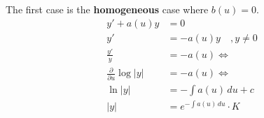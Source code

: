 The first case is the \textbf{homogeneous} case where $b(u) = 0$.
\begin{align*}
    y'+a(u)y & = 0\\
    y' & = -a(u)y \quad ,y\neq 0\\
    \frac{y'}{y} & = -a(u) \Leftrightarrow\\
    \frac{\partial}{\partial u} \log|y| & = -a(u) \Leftrightarrow\\
    \ln|y| & = -\int a(u)\, du + c\\
    |y| & = e^{-\int a(u)\, du}\cdot K
\end{align*}

